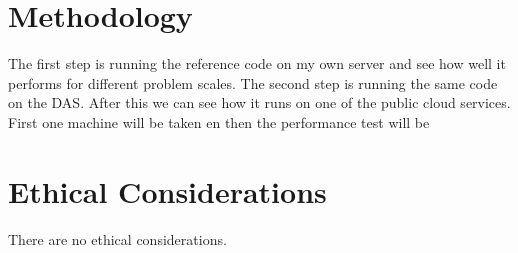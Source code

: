\documentclass[A4]{scrartcl}
\begin{document}
\section*{Methodology}
The first step is running the reference code on my own server and see how well it performs for different problem scales. The second step is running the same code on the DAS. After this we can see how it runs on one of the public cloud services. First one machine will be taken en then the  performance test will be


\section*{Ethical Considerations}
There are no ethical considerations.

\printbibliography
\end{document}
